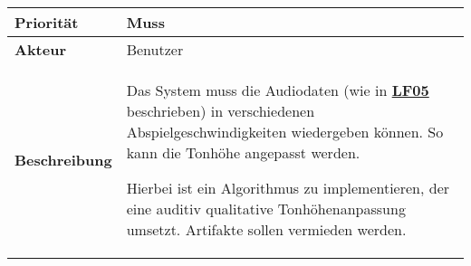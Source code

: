 \begin{table}[h!]
	\begin{tabularx}{\textwidth}{|l|X|}
		\hline
		\textbf{Priorität} & Muss \\ \hline
		\textbf{Akteur} & Benutzer \\ \hline
		\textbf{Beschreibung} & Das System muss die Audiodaten (wie in \textbf{\hyperlink{lf-audioplayback}{LF05}} beschrieben) in verschiedenen Abspielgeschwindigkeiten wiedergeben können. So kann die Tonhöhe angepasst werden.
		
		Hierbei ist ein Algorithmus zu implementieren, der eine auditiv qualitative Tonhöhenanpassung umsetzt. Artifakte sollen vermieden werden.
		\\ \hline
	\end{tabularx}
\end{table}

